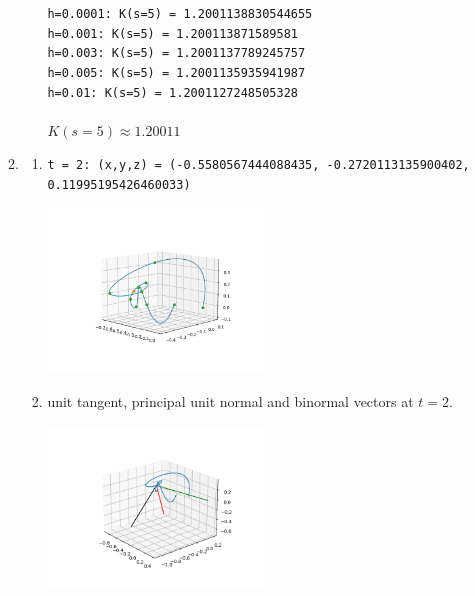 \documentclass[11pt]{article}
\begin{document}
\begin{preview}
\begin{enumerate}
\begin{enumerate}
\begin{enumerate}
                          \texttt{h=0.0001: K(s=5) = 1.2001138830544655} \\
                          \texttt{h=0.001: K(s=5) = 1.200113871589581} \\
                          \texttt{h=0.003: K(s=5) = 1.2001137789245757} \\
                          \texttt{h=0.005: K(s=5) = 1.2001135935941987} \\
                          \texttt{h=0.01: K(s=5) = 1.2001127248505328} \\\\
                          $K(s=5) \approx 1.20011$
                  \end{enumerate}
            \item
                  \begin{enumerate}
                    \item \texttt{t = 2: (x,y,z) = (-0.5580567444088435, -0.2720113135900402, 0.11995195426460033)}
                          \begin{center}
                            \includegraphics[width=0.5\textwidth]{inc/q4bi_0.png}
                          \end{center}
                    \item unit tangent, principal unit normal and binormal vectors at $t = 2$.
                          \begin{center}
                            \includegraphics[width=0.5\textwidth]{inc/q4bii.png}
                          \end{center}

\end{enumerate}
\end{enumerate}
\end{enumerate}
\end{preview}
\end{document}
